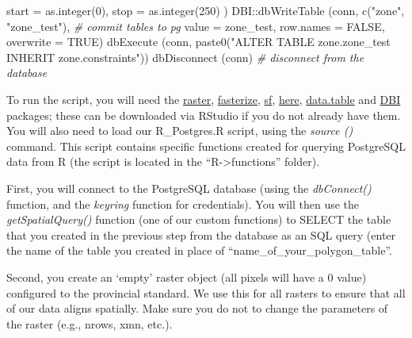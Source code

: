 \documentclass[
]{article}
\newenvironment{Shaded}{\begin{snugshade}}{\end{snugshade}}
\newcommand{\AttributeTok}[1]{\textcolor[rgb]{0.77,0.63,0.00}{#1}}
\newcommand{\CommentTok}[1]{\textcolor[rgb]{0.56,0.35,0.01}{\textit{#1}}}
\newcommand{\ConstantTok}[1]{\textcolor[rgb]{0.00,0.00,0.00}{#1}}
\newcommand{\DecValTok}[1]{\textcolor[rgb]{0.00,0.00,0.81}{#1}}
\newcommand{\FunctionTok}[1]{\textcolor[rgb]{0.00,0.00,0.00}{#1}}
\newcommand{\NormalTok}[1]{#1}
\newcommand{\SpecialCharTok}[1]{\textcolor[rgb]{0.00,0.00,0.00}{#1}}
\newcommand{\StringTok}[1]{\textcolor[rgb]{0.31,0.60,0.02}{#1}}
\begin{document}
\begin{Shaded}
\begin{Highlighting}[]
                         \AttributeTok{start =} \FunctionTok{as.integer}\NormalTok{(}\DecValTok{0}\NormalTok{),}
                         \AttributeTok{stop =} \FunctionTok{as.integer}\NormalTok{(}\DecValTok{250}\NormalTok{)}
\NormalTok{                         )}
\NormalTok{DBI}\SpecialCharTok{::}\FunctionTok{dbWriteTable}\NormalTok{ (conn, }\FunctionTok{c}\NormalTok{(}\StringTok{"zone"}\NormalTok{, }\StringTok{"zone\_test"}\NormalTok{), }\CommentTok{\# commit tables to pg}
                   \AttributeTok{value =}\NormalTok{ zone\_test, }
                   \AttributeTok{row.names =} \ConstantTok{FALSE}\NormalTok{, }
                   \AttributeTok{overwrite =} \ConstantTok{TRUE}\NormalTok{) }
\FunctionTok{dbExecute}\NormalTok{ (conn, }\FunctionTok{paste0}\NormalTok{(}\StringTok{"ALTER TABLE zone.zone\_test INHERIT zone.constraints"}\NormalTok{))}
\FunctionTok{dbDisconnect}\NormalTok{ (conn) }\CommentTok{\# disconnect from the database}
\end{Highlighting}
\end{Shaded}

To run the script, you will need the
\href{https://cran.r-project.org/web/packages/raster/raster.pdf}{raster},
\href{https://cran.r-project.org/web/packages/fasterize/fasterize.pdf}{fasterize},
\href{https://cran.r-project.org/web/packages/sf/sf.pdf}{sf},
\href{https://cran.r-project.org/web/packages/here/here.pdf}{here},
\href{https://cran.r-project.org/web/packages/data.table/data.table.pdf}{data.table}
and \href{https://cran.r-project.org/web/packages/DBI/DBI.pdf}{DBI}
packages; these can be downloaded via RStudio if you do not already have
them. You will also need to load our R\_Postgres.R script, using the
\emph{source ()} command. This script contains specific functions
created for querying PostgreSQL data from R (the script is located in
the ``R-\textgreater functions'' folder).

First, you will connect to the PostgreSQL database (using the
\emph{dbConnect()} function, and the \emph{keyring} function for
credentials). You will then use the \emph{getSpatialQuery()} function
(one of our custom functions) to SELECT the table that you created in
the previous step from the database as an SQL query (enter the name of
the table you created in place of ``name\_of\_your\_polygon\_table''.

Second, you create an `empty' raster object (all pixels will have a 0
value) configured to the provincial standard. We use this for all
rasters to ensure that all of our data aligns spatially. Make sure you
do not to change the parameters of the raster (e.g., nrows, xmn, etc.).
\end{document}
